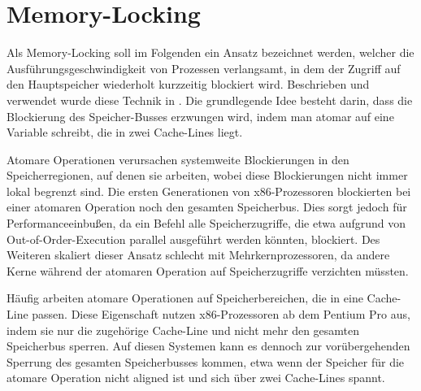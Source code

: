 



\section{Memory-Locking}
\label{MemoryLocking}

Als Memory-Locking soll im Folgenden ein Ansatz bezeichnet werden, welcher die Ausführungsgeschwindigkeit von Prozessen verlangsamt, in dem der Zugriff auf den Hauptspeicher wiederholt kurzzeitig blockiert wird.
Beschrieben und verwendet wurde diese Technik in \cite{MemoryLockingWu, MemoryLockingRisenpart, MemoryLockingJavaAndroid}.
Die grundlegende Idee besteht darin, dass die Blockierung des Speicher-Busses erzwungen wird, indem man atomar auf eine Variable schreibt, die in zwei Cache-Lines liegt.

Atomare Operationen verursachen systemweite Blockierungen in den Speicherregionen, auf denen sie arbeiten, wobei diese Blockierungen nicht immer lokal begrenzt sind.
Die ersten Generationen von x86-Prozessoren blockierten bei einer atomaren Operation noch den gesamten Speicherbus.
Dies sorgt jedoch für Performanceeinbußen, da ein Befehl alle Speicherzugriffe, die etwa aufgrund von Out-of-Order-Execution parallel ausgeführt werden könnten, blockiert.
Des Weiteren skaliert dieser Ansatz schlecht mit Mehrkernprozessoren, da andere Kerne während der atomaren Operation auf Speicherzugriffe verzichten müssten.

Häufig arbeiten atomare Operationen auf Speicherbereichen, die in eine Cache-Line passen. Diese Eigenschaft nutzen x86-Prozessoren ab dem Pentium Pro aus, indem sie nur die zugehörige Cache-Line und nicht mehr den gesamten Speicherbus sperren.
Auf diesen Systemen kann es dennoch zur vorübergehenden Sperrung des gesamten Speicherbusses kommen, etwa wenn der Speicher für die atomare Operation nicht 
aligned %
ist und sich über zwei Cache-Lines spannt.

